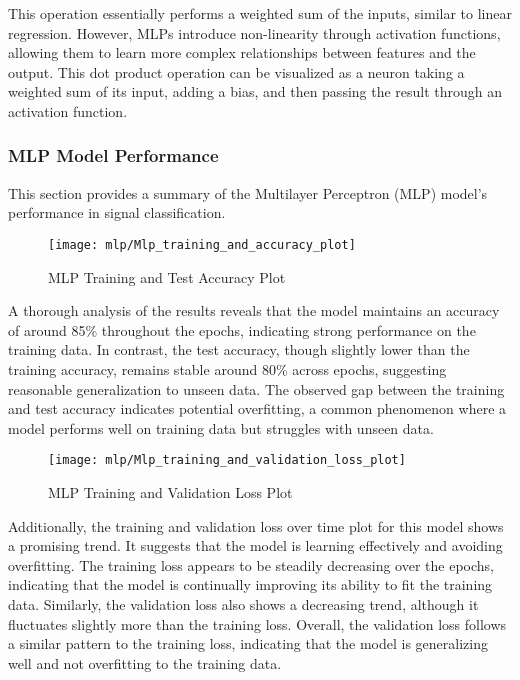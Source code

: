 This operation essentially performs a weighted sum of the inputs, similar to linear regression. However, MLPs introduce non-linearity through activation functions, allowing them to learn more complex relationships between features and the output. This dot product operation can be visualized as a neuron taking a weighted sum of its input, adding a bias, and then passing the result through an activation function.

\subsubsection{MLP Model Performance}

This section provides a summary of the Multilayer Perceptron (MLP) model's performance in signal classification.

\begin{figure}[H] 
	\centering
	\texttt{[image: mlp/Mlp\_training\_and\_accuracy\_plot]}
	\caption{MLP Training and Test Accuracy Plot}\label{fig:mlp_training_and_accuracy_plot}
\end{figure}

A thorough analysis of the results reveals that the model maintains an accuracy of around 85\% throughout the epochs, indicating strong performance on the training data. In contrast, the test accuracy, though slightly lower than the training accuracy, remains stable around 80\% across epochs, suggesting reasonable generalization to unseen data. The observed gap between the training and test accuracy indicates potential overfitting, a common phenomenon where a model performs well on training data but struggles with unseen data.

\begin{figure}[H] 
	\centering
	\texttt{[image: mlp/Mlp\_training\_and\_validation\_loss\_plot]}
	\caption{MLP Training and Validation Loss Plot}\label{fig:mlp_training_and_validation_loss_plot}
\end{figure}

Additionally, the training and validation loss over time plot for this model shows a promising trend. It suggests that the model is learning effectively and avoiding overfitting. The training loss appears to be steadily decreasing over the epochs, indicating that the model is continually improving its ability to fit the training data. Similarly, the validation loss also shows a decreasing trend, although it fluctuates slightly more than the training loss. Overall, the validation loss follows a similar pattern to the training loss, indicating that the model is generalizing well and not overfitting to the training data.

